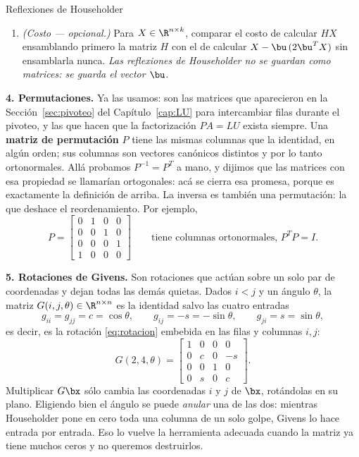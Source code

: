 \begin{entrega}{Reflexiones de Householder}
\begin{enumerate}[label=\textbf{(\alph*)},itemsep=3pt,topsep=4pt]
\item \emph{(Costo --- opcional.)} Para $X\in\R^{n\times k}$, comparar el costo de
calcular $HX$ ensamblando primero la matriz $H$ con el de calcular
$X-\bu\,(2\bu^TX)$ sin ensamblarla nunca. \emph{Las reflexiones de
Householder no se guardan como matrices: se guarda el vector $\bu$.}

\end{enumerate}

\medskip
{}
\end{entrega}

\textbf{4. Permutaciones.} Ya las usamos: son las matrices que aparecieron en
la Sección~\ref{sec:pivoteo} del Capítulo~\ref{cap:LU} para intercambiar filas
durante el pivoteo, y las que hacen que la factorización $PA=LU$ exista
siempre. Una \textbf{matriz de permutación} $P$ tiene las mismas columnas que
la identidad, en algún orden; sus columnas son vectores canónicos distintos y
por lo tanto ortonormales. Allá probamos $P^{-1}=P^T$ a mano, y dijimos que
las matrices con esa propiedad se llamarían ortogonales: acá se cierra esa
promesa, porque es exactamente la definición de arriba. La inversa es también
una permutación: la que deshace el reordenamiento. Por ejemplo,
\[
P=\begin{bmatrix}0&1&0&0\\0&0&1&0\\0&0&0&1\\1&0&0&0\end{bmatrix}
\qquad\text{tiene columnas ortonormales, }P^T P=I .
\]

\textbf{5. Rotaciones de Givens.} Son rotaciones que actúan sobre un solo par
de coordenadas y dejan todas las demás quietas. Dados $i<j$ y un ángulo
$\theta$, la matriz $G(i,j,\theta)\in\R^{n\times n}$ es la identidad salvo
las cuatro entradas
\[
g_{ii}=g_{jj}=c=\cos\theta,
\qquad
g_{ij}=-s=-\sin\theta,
\qquad
g_{ji}=s=\sin\theta,
\]
es decir, es la rotación \eqref{eq:rotacion} embebida en las filas y columnas
$i,j$:
\[
G(2,4,\theta)=
\begin{bmatrix}
1&0&0&0\\
0&c&0&-s\\
0&0&1&0\\
0&s&0&c
\end{bmatrix}.
\]
Multiplicar $G\bx$ sólo cambia las coordenadas $i$ y $j$ de $\bx$, rotándolas
en su plano. Eligiendo bien el ángulo se puede \emph{anular} una de las dos:
mientras Householder pone en cero toda una columna de un solo golpe, Givens
lo hace entrada por entrada. Eso lo vuelve la herramienta adecuada cuando la
matriz ya tiene muchos ceros y no queremos destruirlos.

